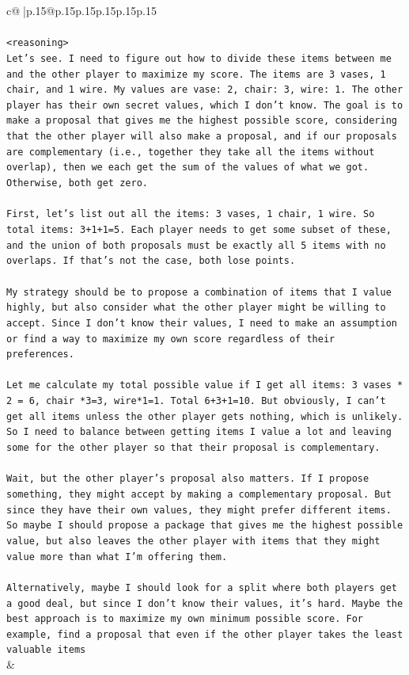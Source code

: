 \documentclass{article}
\begin{document}
{\begin{supertabular}{c@{$\;$}|p{.15\linewidth}@{}p{.15\linewidth}p{.15\linewidth}p{.15\linewidth}p{.15\linewidth}p{.15\linewidth}}
{{{\\ 
\\ 
\texttt{<reasoning>} \\
\texttt{Let's see. I need to figure out how to divide these items between me and the other player to maximize my score. The items are 3 vases, 1 chair, and 1 wire. My values are vase: 2, chair: 3, wire: 1. The other player has their own secret values, which I don't know. The goal is to make a proposal that gives me the highest possible score, considering that the other player will also make a proposal, and if our proposals are complementary (i.e., together they take all the items without overlap), then we each get the sum of the values of what we got. Otherwise, both get zero.} \\
\\ 
\texttt{First, let's list out all the items: 3 vases, 1 chair, 1 wire. So total items: 3+1+1=5. Each player needs to get some subset of these, and the union of both proposals must be exactly all 5 items with no overlaps. If that's not the case, both lose points.} \\
\\ 
\texttt{My strategy should be to propose a combination of items that I value highly, but also consider what the other player might be willing to accept. Since I don't know their values, I need to make an assumption or find a way to maximize my own score regardless of their preferences.} \\
\\ 
\texttt{Let me calculate my total possible value if I get all items: 3 vases * 2 = 6, chair *3=3, wire*1=1. Total 6+3+1=10. But obviously, I can't get all items unless the other player gets nothing, which is unlikely. So I need to balance between getting items I value a lot and leaving some for the other player so that their proposal is complementary.} \\
\\ 
\texttt{Wait, but the other player's proposal also matters. If I propose something, they might accept by making a complementary proposal. But since they have their own values, they might prefer different items. So maybe I should propose a package that gives me the highest possible value, but also leaves the other player with items that they might value more than what I'm offering them.} \\
\\ 
\texttt{Alternatively, maybe I should look for a split where both players get a good deal, but since I don't know their values, it's hard. Maybe the best approach is to maximize my own minimum possible score. For example, find a proposal that even if the other player takes the least valuable items} \\
            }
        }
    }
    & \\ \\


\end{supertabular}}
\end{document}
